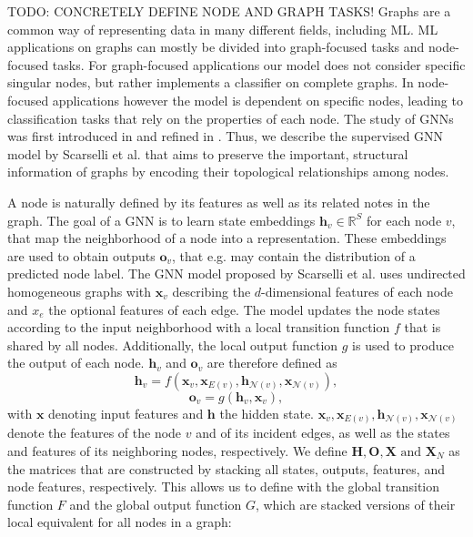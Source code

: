 TODO: CONCRETELY DEFINE NODE AND GRAPH TASKS!
Graphs are a common way of representing data in many different fields, including ML. ML applications on graphs can mostly be divided into graph-focused tasks and node-focused tasks. For graph-focused applications our model does not consider specific singular nodes, but rather implements a classifier on complete graphs. In node-focused applications however the model is dependent on specific nodes, leading to classification tasks that rely on the properties of each node.
The study of GNNs was first introduced in \cite{gori2005new} and refined in \cite{4700287}. Thus, we describe the supervised GNN model by Scarselli et al. \cite{4700287} that aims to preserve the important, structural information of graphs by encoding their topological relationships among nodes. 

A node is naturally defined by its features as well as its related notes in the graph. The goal of a GNN is to learn state embeddings $\mathbf{h}_v \in \mathbb{R}^S$ for each node $v$, that map the neighborhood of a node into a representation. These embeddings are used to obtain outputs $\mathbf{o}_v$, that e.g. may contain the distribution of a predicted node label. The GNN model proposed by Scarselli et al. \cite{4700287} uses undirected homogeneous graphs with $\mathbf{x}_v$ describing the $d$-dimensional features of each node and $x_e$ the optional features of each edge. The model updates the node states according to the input neighborhood with a local transition function $f$ that is shared by all nodes. Additionally, the local output function $g$ is used to produce the output of each node. $\mathbf{h}_v$ and $\mathbf{o}_v$ are therefore defined as
\begin{equation}
    \mathbf{h}_v = f(\mathbf{x}_v, \mathbf{x}_{E(v)}, \mathbf{h}_{\mathcal{N}(v)}, \mathbf{x}_{\mathcal{N}(v)}),
    \label{eq:gnn_state_local}
\end{equation}
\begin{equation}
    \mathbf{o}_v = g(\mathbf{h}_v, \mathbf{x}_v),
\end{equation}
with $\mathbf{x}$ denoting input features and $\mathbf{h}$ the hidden state. $\mathbf{x}_v, \mathbf{x}_{E(v)}, \mathbf{h}_{\mathcal{N}(v)}, \mathbf{x}_{\mathcal{N}(v)}$ denote the features of the node $v$ and of its incident edges, as well as the states and features of its neighboring nodes, respectively. We define $\mathbf{H}, \mathbf{O}, \mathbf{X} \text{ and  }\mathbf{X}_N$ as the matrices that are constructed by stacking all states, outputs, features, and node features, respectively. This allows us to define with the global transition function $F$ and the global output function $G$, which are stacked versions of their local equivalent for all nodes in a graph: 
